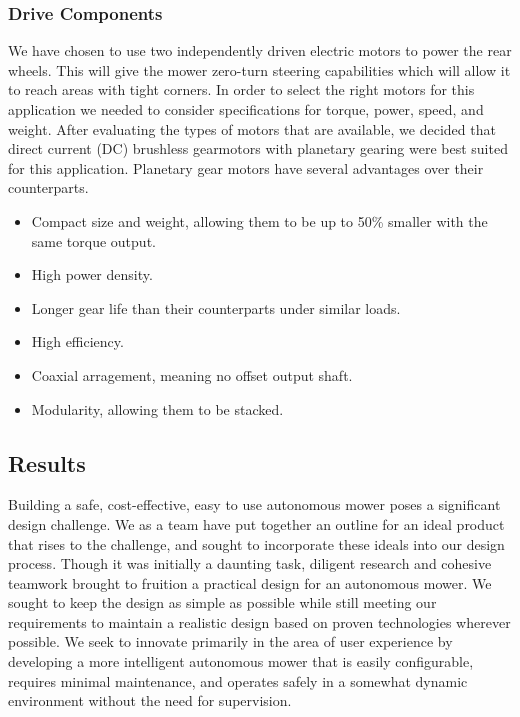 \documentclass[12pt,letterpaper]{article}
\begin{document}
\subsubsection{Drive Components}

We have chosen to use two independently driven electric motors to power the rear
wheels.  This will give the mower zero-turn steering capabilities which will
allow it to reach areas with tight corners.  In order to select the right motors
for this application we needed to consider specifications for torque, power,
speed, and weight.  After evaluating the types of motors that are available, we
decided that direct current (DC) brushless gearmotors with planetary gearing
were best suited for this application.  Planetary gear motors have several
advantages over their counterparts.
\begin{singlespace}
\begin{itemize}
  \item Compact size and weight, allowing them to be up to 50\% smaller with the
  same torque output.
  \item High power density.
  \item Longer gear life than their counterparts under similar loads.
  \item High efficiency.
  \item Coaxial arragement, meaning no offset output shaft.
  \item Modularity, allowing them to be stacked.
\end{itemize}
\end{singlespace}






\subsection{Results}


Building a safe, cost-effective, easy to use autonomous mower poses a
significant design challenge.  We as a team have put together an outline for an
ideal product that rises to the challenge, and sought to incorporate these
ideals into our design process.  Though it was initially a daunting task,
diligent research and cohesive teamwork brought to fruition a practical design
for an autonomous mower.  We sought to keep the design as simple as possible
while still meeting our requirements to maintain a realistic design based on
proven technologies wherever possible.  We seek to innovate primarily in the
area of user experience by developing a more intelligent autonomous mower that
is easily configurable, requires minimal maintenance, and operates safely in a
somewhat dynamic environment without the need for supervision.
\end{document}
